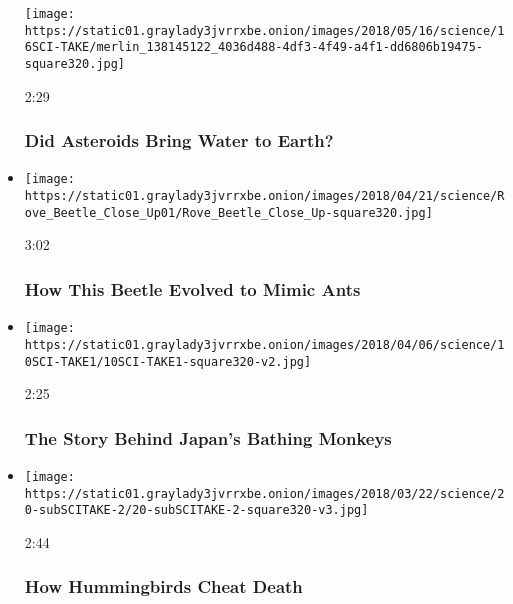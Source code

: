 \begin{itemize}
  \texttt{[image: https://static01.graylady3jvrrxbe.onion/images/2018/05/16/science/16SCI-TAKE/merlin\_138145122\_4036d488-4df3-4f49-a4f1-dd6806b19475-square320.jpg]}

  2:29

  \hypertarget{did-asteroids-bring-water-to-earth}{%
  \subsubsection{Did Asteroids Bring Water to
  Earth?}\label{did-asteroids-bring-water-to-earth}}
\item
  \href{https://www.nytimes3xbfgragh.onion/video/science/100000005813865/how-this-beetle-evolved-to-mimic-ants.html?action=click\&module=video-series-bar\&region=header\&pgtype=Article\&playlistId=video/sciencetake}{}

  \texttt{[image: https://static01.graylady3jvrrxbe.onion/images/2018/04/21/science/Rove\_Beetle\_Close\_Up01/Rove\_Beetle\_Close\_Up-square320.jpg]}

  3:02

  \hypertarget{how-this-beetle-evolved-to-mimic-ants}{%
  \subsubsection{How This Beetle Evolved to Mimic
  Ants}\label{how-this-beetle-evolved-to-mimic-ants}}
\item
  \href{https://www.nytimes3xbfgragh.onion/video/science/100000005800676/the-story-behind-japans-bathing-monkeys.html?action=click\&module=video-series-bar\&region=header\&pgtype=Article\&playlistId=video/sciencetake}{}

  \texttt{[image: https://static01.graylady3jvrrxbe.onion/images/2018/04/06/science/10SCI-TAKE1/10SCI-TAKE1-square320-v2.jpg]}

  2:25

  \hypertarget{the-story-behind-japans-bathing-monkeys}{%
  \subsubsection{The Story Behind Japan's Bathing
  Monkeys}\label{the-story-behind-japans-bathing-monkeys}}
\item
  \href{https://www.nytimes3xbfgragh.onion/video/science/100000005789167/how-hummingbirds-cheat-death.html?action=click\&module=video-series-bar\&region=header\&pgtype=Article\&playlistId=video/sciencetake}{}

  \texttt{[image: https://static01.graylady3jvrrxbe.onion/images/2018/03/22/science/20-subSCITAKE-2/20-subSCITAKE-2-square320-v3.jpg]}

  2:44

  \hypertarget{how-hummingbirds-cheat-death}{%
  \subsubsection{How Hummingbirds Cheat
  Death}\label{how-hummingbirds-cheat-death}}
\end{itemize}

